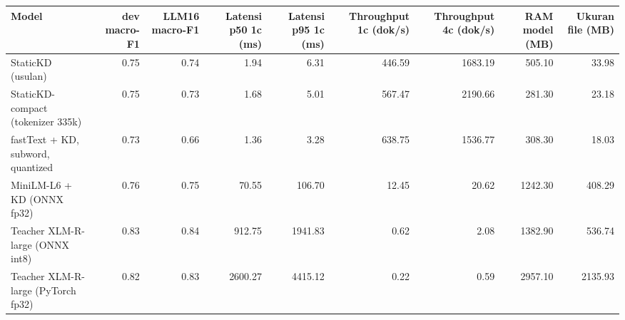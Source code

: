 \begin{tabular}{lrrrrrrrr}
\toprule
Model & dev macro-F1 & LLM16 macro-F1 & Latensi p50 1c (ms) & Latensi p95 1c (ms) & Throughput 1c (dok/s) & Throughput 4c (dok/s) & RAM model (MB) & Ukuran file (MB) \\
\midrule
StaticKD (usulan) & 0.75 & 0.74 & 1.94 & 6.31 & 446.59 & 1683.19 & 505.10 & 33.98 \\
StaticKD-compact (tokenizer 335k) & 0.75 & 0.73 & 1.68 & 5.01 & 567.47 & 2190.66 & 281.30 & 23.18 \\
fastText + KD, subword, quantized & 0.73 & 0.66 & 1.36 & 3.28 & 638.75 & 1536.77 & 308.30 & 18.03 \\
MiniLM-L6 + KD (ONNX fp32) & 0.76 & 0.75 & 70.55 & 106.70 & 12.45 & 20.62 & 1242.30 & 408.29 \\
Teacher XLM-R-large (ONNX int8) & 0.83 & 0.84 & 912.75 & 1941.83 & 0.62 & 2.08 & 1382.90 & 536.74 \\
Teacher XLM-R-large (PyTorch fp32) & 0.82 & 0.83 & 2600.27 & 4415.12 & 0.22 & 0.59 & 2957.10 & 2135.93 \\
\bottomrule
\end{tabular}
